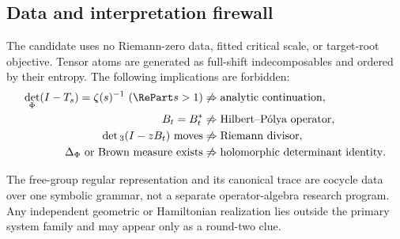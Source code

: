 \subsection{Data and interpretation firewall}

The candidate uses no Riemann-zero data, fitted critical scale, or
target-root objective.  Tensor atoms are generated as full-shift
indecomposables and ordered by their entropy.  The following implications
are forbidden:
\begin{align*}
 \det_\Phi(I-T_s)=\zeta(s)^{-1}\ (\RePart s>1)
 &\not\Rightarrow\text{analytic continuation},\\
 B_t=B_t^*&\not\Rightarrow\text{Hilbert--P\'olya operator},\\
 \det{}_3(I-zB_t)\text{ moves}
 &\not\Rightarrow\text{Riemann divisor},\\
 \Delta_\Phi\text{ or Brown measure exists}
 &\not\Rightarrow\text{holomorphic determinant identity}.
\end{align*}

The free-group regular representation and its canonical trace are cocycle
data over one symbolic grammar, not a separate operator-algebra research
program.  Any independent geometric or Hamiltonian realization lies outside
the primary system family and may appear only as a round-two clue.
